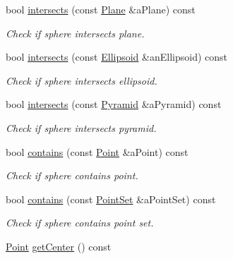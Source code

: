 \begin{DoxyCompactItemize}
bool \hyperlink{classlibrary_1_1math_1_1geom_1_1d3_1_1objects_1_1_sphere_aa0893ce62c0798552353338aad0b8da4}{intersects} (const \hyperlink{classlibrary_1_1math_1_1geom_1_1d3_1_1objects_1_1_plane}{Plane} \&a\+Plane) const
\begin{DoxyCompactList}\small\item\em Check if sphere intersects plane. \end{DoxyCompactList}\item 
bool \hyperlink{classlibrary_1_1math_1_1geom_1_1d3_1_1objects_1_1_sphere_ad278cbe34b3fde84126202d772f9df27}{intersects} (const \hyperlink{classlibrary_1_1math_1_1geom_1_1d3_1_1objects_1_1_ellipsoid}{Ellipsoid} \&an\+Ellipsoid) const
\begin{DoxyCompactList}\small\item\em Check if sphere intersects ellipsoid. \end{DoxyCompactList}\item 
bool \hyperlink{classlibrary_1_1math_1_1geom_1_1d3_1_1objects_1_1_sphere_a698e81554ca85819741fdfdcd123e8a1}{intersects} (const \hyperlink{classlibrary_1_1math_1_1geom_1_1d3_1_1objects_1_1_pyramid}{Pyramid} \&a\+Pyramid) const
\begin{DoxyCompactList}\small\item\em Check if sphere intersects pyramid. \end{DoxyCompactList}\item 
bool \hyperlink{classlibrary_1_1math_1_1geom_1_1d3_1_1objects_1_1_sphere_a2780e2754d206379fbe2cdc06b799a2e}{contains} (const \hyperlink{classlibrary_1_1math_1_1geom_1_1d3_1_1objects_1_1_point}{Point} \&a\+Point) const
\begin{DoxyCompactList}\small\item\em Check if sphere contains point. \end{DoxyCompactList}\item 
bool \hyperlink{classlibrary_1_1math_1_1geom_1_1d3_1_1objects_1_1_sphere_a75120c9d3ff75cd389ae9ccb98a4218b}{contains} (const \hyperlink{classlibrary_1_1math_1_1geom_1_1d3_1_1objects_1_1_point_set}{Point\+Set} \&a\+Point\+Set) const
\begin{DoxyCompactList}\small\item\em Check if sphere contains point set. \end{DoxyCompactList}\item 
\hyperlink{classlibrary_1_1math_1_1geom_1_1d3_1_1objects_1_1_point}{Point} \hyperlink{classlibrary_1_1math_1_1geom_1_1d3_1_1objects_1_1_sphere_a871367ab75aa46194a6b8ddc8a45967f}{get\+Center} () const

\end{DoxyCompactItemize}
